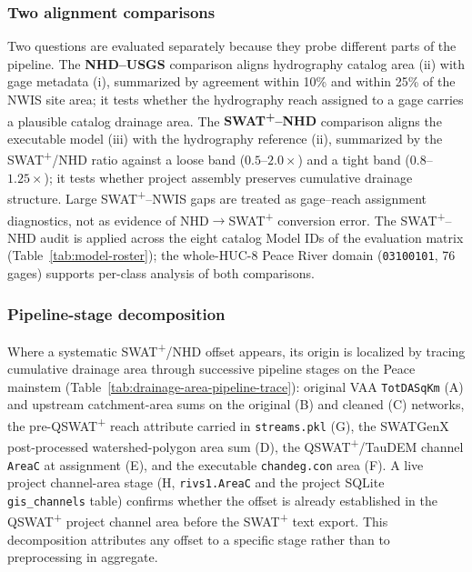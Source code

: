 \subsubsection*{Two alignment comparisons}
Two questions are evaluated separately because they probe different parts of the pipeline.
The \textbf{NHD--USGS} comparison aligns hydrography catalog area (ii) with gage metadata (i), summarized by agreement within 10\% and within 25\% of the NWIS site area; it tests whether the hydrography reach assigned to a gage carries a plausible catalog drainage area.
The \textbf{SWAT\textsuperscript{+}--NHD} comparison aligns the executable model (iii) with the hydrography reference (ii), summarized by the SWAT\textsuperscript{+}/NHD ratio against a loose band ($0.5$--$2.0\times$) and a tight band ($0.8$--$1.25\times$); it tests whether project assembly preserves cumulative drainage structure.
Large SWAT\textsuperscript{+}--NWIS gaps are treated as gage--reach assignment diagnostics, not as evidence of NHD$\rightarrow$SWAT\textsuperscript{+} conversion error.
The SWAT\textsuperscript{+}--NHD audit is applied across the eight catalog Model IDs of the evaluation matrix (Table~\ref{tab:model-roster}); the whole-HUC-8 Peace River domain (\texttt{03100101}, 76 gages) supports per-class analysis of both comparisons.

\subsubsection*{Pipeline-stage decomposition}
Where a systematic SWAT\textsuperscript{+}/NHD offset appears, its origin is localized by tracing cumulative drainage area through successive pipeline stages on the Peace mainstem (Table~\ref{tab:drainage-area-pipeline-trace}): original VAA \texttt{TotDASqKm} (A) and upstream catchment-area sums on the original (B) and cleaned (C) networks, the pre-QSWAT\textsuperscript{+} reach attribute carried in \texttt{streams.pkl} (G), the SWATGenX post-processed watershed-polygon area sum (D), the QSWAT\textsuperscript{+}/TauDEM channel \texttt{AreaC} at assignment (E), and the executable \texttt{chandeg.con} area (F).
A live project channel-area stage (H, \texttt{rivs1.AreaC} and the project SQLite \texttt{gis\_channels} table) confirms whether the offset is already established in the QSWAT\textsuperscript{+} project channel area before the SWAT\textsuperscript{+} text export.
This decomposition attributes any offset to a specific stage rather than to preprocessing in aggregate.
